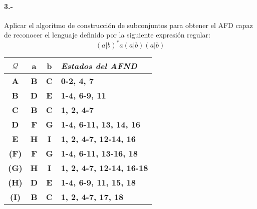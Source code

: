 \documentclass[11pt,a4paper,table,answers]{exam} %
\newcommand{\h}[1]{\ifprintanswers\textcolor{azul}{\bf#1}\else{\phantom{\bf#1}}\fi}
\newlength{\graphicheigth}
\newcommand{\myincludegraphicssol}[1]{%
    \sbox{\graphicbox}{%
        \begin{adjustbox}{max size={\textwidth}{\textheight}}
            \texttt{[image: \#1]}
        \end{adjustbox}
    }
    \settoheight{\graphicheigth}{\usebox{\graphicbox}}
    \addtolength{\graphicheigth}{4ex} %
    \ifprintanswers
        \begin{center}
            \usebox{\graphicbox}
        \end{center} 
    \else
        \makeemptybox{\graphicheigth}
    \fi
}
\begin{document}
\paragraph{3.-}\label{p3}
Aplicar el algoritmo de construcción de subconjuntos para obtener el AFD capaz de reconocer el lenguaje definido por la siguiente expresión regular:
\[
    (a|b)^*a(a|b)(a|b)
\]
\myincludegraphicssol{}
\begin{tabular} {c@{\hspace{4mm}}cc@{\hspace{4mm}}l}
\toprule %
$\mathcal{Q}$ & a & b & \emph{Estados del AFND}\\
\midrule %
\h{A} & \h{B} & \h{C} & \h{0-2, 4, 7}\\
\h{B} & \h{D} & \h{E} & \h{1-4, 6-9, 11}\\
\h{C} & \h{B} & \h{C} & \h{1, 2, 4-7}\\
\h{D} & \h{F} & \h{G} & \h{1-4, 6-11, 13, 14, 16}\\
\h{E} & \h{H} & \h{I} & \h{1, 2, 4-7, 12-14, 16}\\
\h{(F)} & \h{F} & \h{G} & \h{1-4, 6-11, 13-16, 18}\\
\h{(G)} & \h{H} & \h{I} & \h{1, 2, 4-7, 12-14, 16-18}\\
\h{(H)} & \h{D} & \h{E} & \h{1-4, 6-9, 11, 15, 18}\\
\h{(I)} & \h{B} & \h{C} & \h{1, 2, 4-7, 17, 18}\\
\bottomrule %
\end{tabular}
\end{document}
